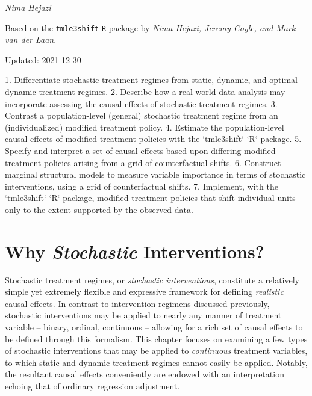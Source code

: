 \documentclass[
  12pt, krantz2,
]{krantz}
\newcommand{\passthrough}[1]{#1}
\newcommand{\1}{\mathbbm{1}}
\theoremstyle{definition}
\theoremstyle{definition}
\theoremstyle{definition}
\theoremstyle{definition}
\theoremstyle{remark}
\begin{document}
\emph{Nima Hejazi}

Based on the \href{https://github.com/tlverse/tmle3shift}{\passthrough{\lstinline!tmle3shift!} \passthrough{\lstinline!R!} package}
by \emph{Nima Hejazi, Jeremy Coyle, and Mark van der Laan}.

Updated: 2021-12-30

\begin{VT1}



1. Differentiate stochastic treatment regimes from static, dynamic, and optimal
   dynamic treatment regimes.
2. Describe how a real-world data analysis may incorporate assessing the causal
   effects of stochastic treatment regimes.
3. Contrast a population-level (general) stochastic treatment regime from an
   (individualized) modified treatment policy.
4. Estimate the population-level causal effects of modified treatment policies
   with the `tmle3shift` `R` package.
5. Specify and interpret a set of causal effects based upon differing modified
   treatment policies arising from a grid of counterfactual shifts.
6. Construct marginal structural models to measure variable importance in terms
   of stochastic interventions, using a grid of counterfactual shifts.
7. Implement, with the `tmle3shift` `R` package, modified treatment policies
   that shift individual units only to the extent supported by the observed
   data.

\end{VT1}

\hypertarget{why-stochastic-interventions}{%
\section{\texorpdfstring{Why \emph{Stochastic} Interventions?}{Why Stochastic Interventions?}}\label{why-stochastic-interventions}}

Stochastic treatment regimes, or \emph{stochastic interventions}, constitute a
relatively simple yet extremely flexible and expressive framework for defining
\emph{realistic} causal effects. In contrast to intervention regimens discussed
previously, stochastic interventions may be applied to nearly any manner of
treatment variable -- binary, ordinal, continuous -- allowing for a rich set of
causal effects to be defined through this formalism. This chapter focuses on
examining a few types of stochastic interventions that may be applied to
\emph{continuous} treatment variables, to which static and dynamic treatment regimes
cannot easily be applied. Notably, the resultant causal effects conveniently are
endowed with an interpretation echoing that of ordinary regression adjustment.
\end{document}
